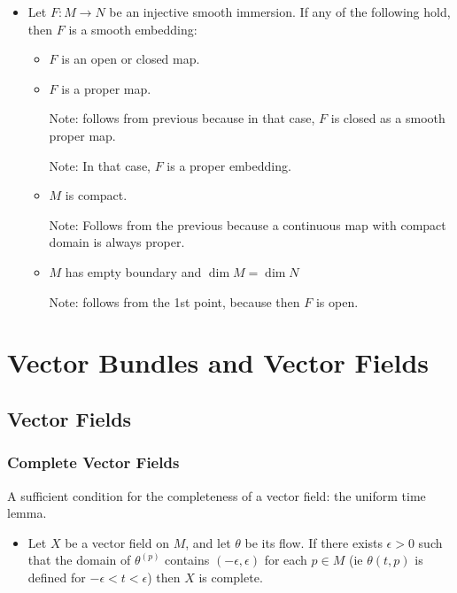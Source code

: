 \documentclass{report}
\theoremstyle{definition}
\begin{document}
\begin{itemize}
    \item Let $F:M\to N$ be an injective smooth immersion. If any of the following hold, then $F$ is a smooth embedding:
    \begin{itemize}
        \item $F$ is an open or closed map.
        \item $F$ is a proper map.

        Note: follows from previous because in that case, $F$ is closed as a smooth proper map.

        Note: In that case, $F$ is a proper embedding.
        \item $M$ is compact.

        Note: Follows from the previous because a continuous map with compact domain is always proper.

        \item $M$ has empty boundary and $\dim M=\dim N$

        Note: follows from the 1st point, because then $F$ is open.
    \end{itemize}
\end{itemize}

\chapter{Vector Bundles and Vector Fields}

\section{Vector Fields}

\subsection{Complete Vector Fields}

A sufficient condition for the completeness of a vector field: the uniform time lemma.
\begin{itemize}
    \item Let $X$ be a vector field on $M$, and let $\theta$ be its flow. If there exists $\epsilon>0$ such that the domain of $\theta^{(p)}$ contains $(-\epsilon,\epsilon)$ for each $p\in M$ (ie $\theta(t,p)$ is defined for $-\epsilon<t<\epsilon$) then $X$ is complete.
\end{itemize}
\end{document}
